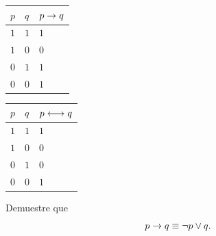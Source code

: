 \documentclass[xcolor={svgnames},
  hyperref={colorlinks}, 
  spanish, 12pt]{beamer}
\numberwithin{equation}{section} %
\numberwithin{figure}{section} %
\begin{document}
\begin{frame}
 \begin{tdv}[Condicional]
\begin{center}
 \begin{tabular}{|l|l||l|} \hline
$p$ & $q$ & $p \rightarrow q$ \\ \hline
$1$ & $1$ & $1$ \\ \hline
$1$ & $0$ & $0$ \\ \hline
$0$ & $1$ & $1$ \\ \hline
$0$ & $0$ & $1$ \\ \hline
\end{tabular}
\end{center}

 \end{tdv}

\end{frame}

\begin{frame}
 \begin{tdv}[Bicondicional]
\begin{center}
\begin{tabular}{|l|l||l|} \hline
$p$ & $q$ & $p \longleftrightarrow q$ \\ \hline
$1$ & $1$ & $1$ \\ \hline
$1$ & $0$ & $0$ \\ \hline
$0$ & $1$ & $0$ \\ \hline
$0$ & $0$ & $1$ \\ \hline
\end{tabular}
\end{center}

 \end{tdv}

\end{frame}

\begin{frame}
 \begin{exmp}
  Demuestre que $$p\rightarrow q \equiv \neg p \vee q.$$
 \end{exmp}

\end{frame}
\end{document}

